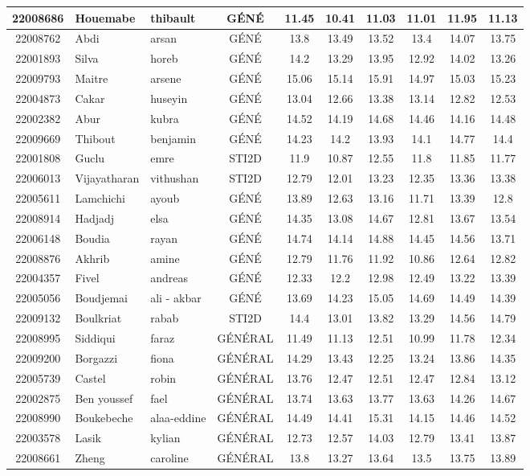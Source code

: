 \documentclass{article}%
\begin{document}
\begin{tabular}{|c|l|l|c|c|c|c|c|c|c|}
\hline%
22008686&Houemabe&thibault&GÉNÉ&11.45&10.41&11.03&11.01&11.95&11.13\\%
\hline%
22008762&Abdi&arsan&GÉNÉ&13.8&13.49&13.52&13.4&14.07&13.75\\%
\hline%
22001893&Silva&horeb&GÉNÉ&14.2&13.29&13.95&12.92&14.02&13.26\\%
\hline%
22009793&Maitre&arsene&GÉNÉ&15.06&15.14&15.91&14.97&15.03&15.23\\%
\hline%
22004873&Cakar&huseyin&GÉNÉ&13.04&12.66&13.38&13.14&12.82&12.53\\%
\hline%
22002382&Abur&kubra&GÉNÉ&14.52&14.19&14.68&14.46&14.16&14.48\\%
\hline%
22009669&Thibout&benjamin&GÉNÉ&14.23&14.2&13.93&14.1&14.77&14.4\\%
\hline%
22001808&Guclu&emre&STI2D&11.9&10.87&12.55&11.8&11.85&11.77\\%
\hline%
22006013&Vijayatharan&vithushan&STI2D&12.79&12.01&13.23&12.35&13.36&13.38\\%
\hline%
22005611&Lamchichi&ayoub&GÉNÉ&13.89&12.63&13.16&11.71&13.39&12.8\\%
\hline%
22008914&Hadjadj&elsa&GÉNÉ&14.35&13.08&14.67&12.81&13.67&13.54\\%
\hline%
22006148&Boudia&rayan&GÉNÉ&14.74&14.14&14.88&14.45&14.56&13.71\\%
\hline%
22008876&Akhrib&amine&GÉNÉ&12.79&11.76&11.92&10.86&12.64&12.82\\%
\hline%
22004357&Fivel&andreas&GÉNÉ&12.33&12.2&12.98&12.49&13.22&13.39\\%
\hline%
22005056&Boudjemai&ali {-} akbar&GÉNÉ&13.69&14.23&15.05&14.69&14.49&14.39\\%
\hline%
22009132&Boulkriat&rabab&STI2D&14.4&13.01&13.82&13.29&14.56&14.79\\%
\hline%
22008995&Siddiqui&faraz&GÉNÉRAL&11.49&11.13&12.51&10.99&11.78&12.34\\%
\hline%
22009200&Borgazzi&fiona&GÉNÉRAL&14.29&13.43&12.25&13.24&13.86&14.35\\%
\hline%
22005739&Castel&robin&GÉNÉRAL&13.76&12.47&12.51&12.47&12.84&13.12\\%
\hline%
22002875&Ben youssef&fael&GÉNÉRAL&13.74&13.63&13.77&13.63&14.26&14.67\\%
\hline%
22008990&Boukebeche&alaa{-}eddine&GÉNÉRAL&14.49&14.41&15.31&14.15&14.46&14.52\\%
\hline%
22003578&Lasik&kylian&GÉNÉRAL&12.73&12.57&14.03&12.79&13.41&13.87\\%
\hline%
22008661&Zheng&caroline&GÉNÉRAL&13.8&13.27&13.64&13.5&13.75&13.89\\%

\end{tabular}
\end{document}
